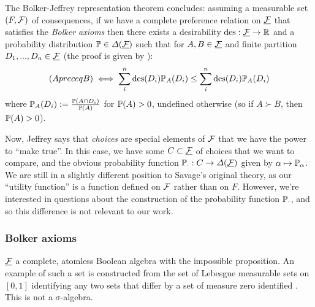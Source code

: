 The Bolker-Jeffrey representation theorem concludes: assuming a measurable set $(F,\mathcal{F})$ of consequences, if we have a complete preference relation on $\underline{\mathcal{F}}$ that satisfies the \emph{Bolker axioms} then there exists a desirability $\text{des}:\underline{\mathcal{F}}\to\mathbb{R}$ and a probability distribution $\mathbb{P}\in \Delta(\underline{\mathcal{F}})$ such that for $A,B\in \underline{\mathcal{F}}$ and finite partition $D_1,...,D_n\in \underline{\mathcal{F}}$ (the proof is given by \citet{bolker_functions_1966}):
\begin{align}
    (A preceq B) \iff \sum_{i}^n \text{des}(D_i) \mathbb{P}_A(D_i) \leq \sum_{i}^n \text{des}(D_i) \mathbb{P}_A(D_i) \label{eq:ev_dec_theory}
\end{align}
where $\mathbb{P}_A(D_i):=\frac{\mathbb{P}(A\cap D_i)}{\mathbb{P}(A)}$ for $\mathbb{P}(A)>0$, undefined otherwise (so if $A\succ B$, then $\mathbb{P}(A)>0$).


Now, Jeffrey says that \emph{choices} are special elements of $\mathcal{F}$ that we have the power to ``make true''. In this case, we have some $C\subset\underline{\mathcal{F}}$ of choices that we want to compare, and the obvious probability function $\mathbb{P}_\cdot: C\to \Delta(\underline{\mathcal{F}})$ given by $\alpha\mapsto \mathbb{P}_\alpha$. We are still in a slightly different position to Savage's original theory, as our ``utility function'' is a function defined on $\mathcal{F}$ rather than on $F$. However, we're interested in questions about the construction of the probability function $\mathbb{P}_\cdot$, and so this difference is not relevant to our work.

\subsubsection{Bolker axioms}

$\underline{\mathcal{F}}$ a complete, atomless Boolean algebra with the impossible proposition. An example of such a set is constructed from the set of Lebesgue measurable sets on $[0,1]$ identifying any two sets that differ by a set of measure zero identified \citet{bolker_simultaneous_1967}. This is not a $\sigma$-algebra.
 

